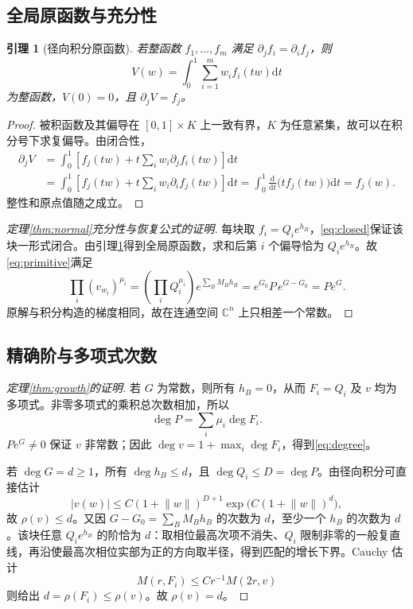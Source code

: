 \documentclass[UTF8,11pt,a4paper,fontset=fandol]{ctexart}
\newtheorem{lemma}[theorem]{引理}
\theoremstyle{definition}\newtheorem{definition}[theorem]{定义}
\theoremstyle{remark}\newtheorem{remark}[theorem]{注}
\newcommand{\C}{\mathbb C}\newcommand{\N}{\mathbb N}
\newcommand{\dd}{\mathrm d}\newcommand{\OO}{\mathcal O}
\begin{document}
\subsection{全局原函数与充分性}
\begin{lemma}[径向积分原函数]\label{lem:primitive}
若整函数 $f_1,\ldots,f_m$ 满足 $\partial_jf_i=\partial_if_j$，则
\[
V(w)=\int_0^1\sum_{i=1}^m w_i f_i(tw)\dd t
\]
为整函数，$V(0)=0$，且 $\partial_jV=f_j$。
\end{lemma}
\begin{proof}
被积函数及其偏导在 $[0,1]\times K$ 上一致有界，$K$ 为任意紧集，故可以在积分号下求复偏导。由闭合性，
\begin{align*}
\partial_jV
&=\int_0^1\left[f_j(tw)+t\sum_iw_i\partial_jf_i(tw)\right]\dd t\\
&=\int_0^1\left[f_j(tw)+t\sum_iw_i\partial_if_j(tw)\right]\dd t
=\int_0^1\frac{\dd}{\dd t}\bigl(tf_j(tw)\bigr)\dd t=f_j(w).
\end{align*}
整性和原点值随之成立。
\end{proof}

\begin{proof}[定理\ref{thm:normal}充分性与恢复公式的证明]
每块取 $f_i=Q_i e^{h_B}$，\eqref{eq:closed}保证该块一形式闭合。由引理\ref{lem:primitive}得到全局原函数，求和后第 $i$ 个偏导恰为 $Q_i e^{h_B}$。故\eqref{eq:primitive}满足
\[
\prod_i(v_{w_i})^{\mu_i}
=\left(\prod_iQ_i^{\mu_i}\right)e^{\sum_BM_Bh_B}
=e^{G_0}P\,e^{G-G_0}=Pe^G.
\]
原解与积分构造的梯度相同，故在连通空间 $\C^n$ 上只相差一个常数。
\end{proof}

\subsection{精确阶与多项式次数}
\begin{proof}[定理\ref{thm:growth}的证明]
若 $G$ 为常数，则所有 $h_B=0$，从而 $F_i=Q_i$ 及 $v$ 均为多项式。非零多项式的乘积总次数相加，所以
\[
\deg P=\sum_i\mu_i\deg F_i.
\]
$Pe^G\ne0$ 保证 $v$ 非常数；因此 $\deg v=1+\max_i\deg F_i$，得到\eqref{eq:degree}。

若 $\deg G=d\ge1$，所有 $\deg h_B\le d$，且 $\deg Q_i\le D=\deg P$。由径向积分可直接估计
\[
|v(w)|\le C(1+\lVert w\rVert)^{D+1}
\exp\bigl(C(1+\lVert w\rVert)^d\bigr),
\]
故 $\rho(v)\le d$。又因 $G-G_0=\sum_BM_Bh_B$ 的次数为 $d$，至少一个 $h_B$ 的次数为 $d$。该块任意 $Q_i e^{h_B}$ 的阶恰为 $d$：取相位最高次项不消失、$Q_i$ 限制非零的一般复直线，再沿使最高次相位实部为正的方向取半径，得到匹配的增长下界。Cauchy 估计
\[
M(r,F_i)\le C r^{-1}M(2r,v)
\]
则给出 $d=\rho(F_i)\le\rho(v)$。故 $\rho(v)=d$。
\end{proof}
\end{document}

